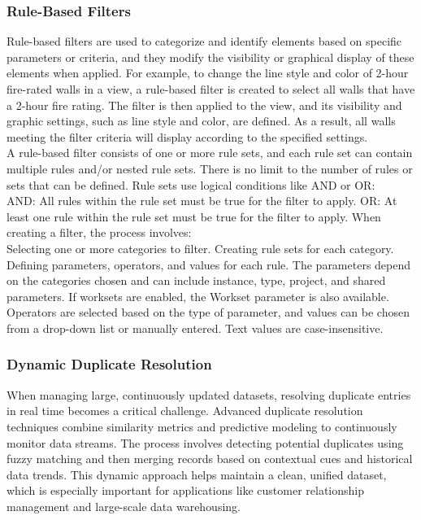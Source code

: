         \subsubsection{Rule-Based Filters}
        Rule-based filters are used to categorize and identify elements based on specific parameters or criteria, and they modify the visibility or graphical display of these elements when applied. For example, to change the line style and color of 2-hour fire-rated walls in a view, a rule-based filter is created to select all walls that have a 2-hour fire rating. The filter is then applied to the view, and its visibility and graphic settings, such as line style and color, are defined. As a result, all walls meeting the filter criteria will display according to the specified settings.\\

        A rule-based filter consists of one or more rule sets, and each rule set can contain multiple rules and/or nested rule sets. There is no limit to the number of rules or sets that can be defined. Rule sets use logical conditions like AND or OR:\\
        
        AND: All rules within the rule set must be true for the filter to apply.
        OR: At least one rule within the rule set must be true for the filter to apply.
        When creating a filter, the process involves:\\
        
        Selecting one or more categories to filter.
        Creating rule sets for each category.
        Defining parameters, operators, and values for each rule. The parameters depend on the categories chosen and can include instance, type, project, and shared parameters. If worksets are enabled, the Workset parameter is also available. Operators are selected based on the type of parameter, and values can be chosen from a drop-down list or manually entered. Text values are case-insensitive.
        \subsubsection{Dynamic Duplicate Resolution}
        When managing large, continuously updated datasets, resolving duplicate entries in real time becomes a critical challenge. Advanced duplicate resolution techniques combine similarity metrics and predictive modeling to continuously monitor data streams. The process involves detecting potential duplicates using fuzzy matching and then merging records based on contextual cues and historical data trends. This dynamic approach helps maintain a clean, unified dataset, which is especially important for applications like customer relationship management and large-scale data warehousing.



